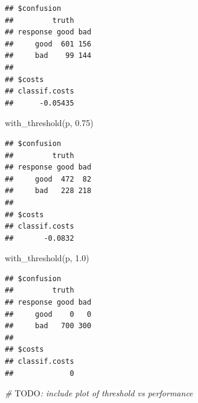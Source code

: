 \documentclass[
]{scrbook}
\newenvironment{Shaded}{\begin{snugshade}}{\end{snugshade}}
\newcommand{\AlertTok}[1]{\textcolor[rgb]{0.94,0.16,0.16}{#1}}
\newcommand{\AttributeTok}[1]{\textcolor[rgb]{0.77,0.63,0.00}{#1}}
\newcommand{\CommentTok}[1]{\textcolor[rgb]{0.56,0.35,0.01}{\textit{#1}}}
\newcommand{\ControlFlowTok}[1]{\textcolor[rgb]{0.13,0.29,0.53}{\textbf{#1}}}
\newcommand{\FloatTok}[1]{\textcolor[rgb]{0.00,0.00,0.81}{#1}}
\newcommand{\FunctionTok}[1]{\textcolor[rgb]{0.00,0.00,0.00}{#1}}
\newcommand{\NormalTok}[1]{#1}
\newcommand{\OtherTok}[1]{\textcolor[rgb]{0.56,0.35,0.01}{#1}}
\newcommand{\SpecialCharTok}[1]{\textcolor[rgb]{0.00,0.00,0.00}{#1}}
\renewenvironment{Shaded} {\begin{snugshade}\small} {\end{snugshade}}
\begin{document}
\begin{Shaded}
\end{Shaded}

\begin{verbatim}
## $confusion
##         truth
## response good bad
##     good  601 156
##     bad    99 144
## 
## $costs
## classif.costs 
##      -0.05435
\end{verbatim}

\begin{Shaded}
\begin{Highlighting}[]
\FunctionTok{with\_threshold}\NormalTok{(p, }\FloatTok{0.75}\NormalTok{)}
\end{Highlighting}
\end{Shaded}

\begin{verbatim}
## $confusion
##         truth
## response good bad
##     good  472  82
##     bad   228 218
## 
## $costs
## classif.costs 
##       -0.0832
\end{verbatim}

\begin{Shaded}
\begin{Highlighting}[]
\FunctionTok{with\_threshold}\NormalTok{(p, }\FloatTok{1.0}\NormalTok{)}
\end{Highlighting}
\end{Shaded}

\begin{verbatim}
## $confusion
##         truth
## response good bad
##     good    0   0
##     bad   700 300
## 
## $costs
## classif.costs 
##             0
\end{verbatim}

\begin{Shaded}
\begin{Highlighting}[]
\CommentTok{\# }\AlertTok{TODO}\CommentTok{: include plot of threshold vs performance}
\end{Highlighting}
\end{Shaded}
\end{document}
